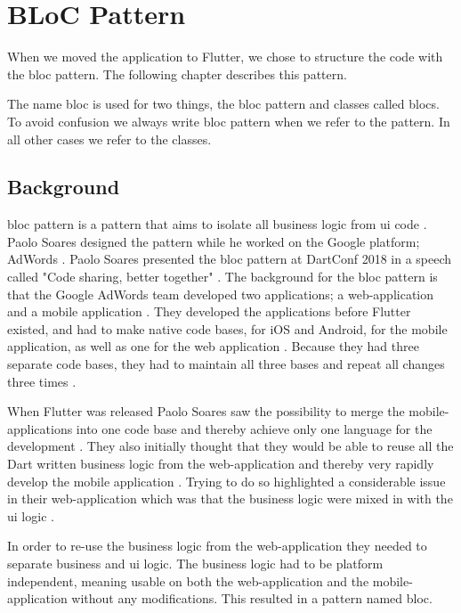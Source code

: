 \section{BLoC Pattern}
When we moved the application to Flutter, we chose to structure the code with the \gls{bloc} pattern. The following chapter describes this pattern.

The name \gls{bloc} is used for two things, the \gls{bloc} pattern and classes called \glspl{bloc}. To avoid confusion we always write \gls{bloc} pattern when we refer to the pattern. In all other cases we refer to the classes.

\subsection{Background}
\gls{bloc} pattern is a pattern that aims to isolate all business logic from \gls{ui} code \cite{blocPattern}. Paolo Soares designed the pattern while he worked on the Google platform; AdWords \cite[30 sec]{blocPattern}. Paolo Soares presented the \gls{bloc} pattern at DartConf 2018 in a speech called "Code sharing, better together" \cite{blocPattern}.
The background for the \gls{bloc} pattern is that the Google AdWords team  developed two applications; a web-application and a mobile application \cite[30 sec]{blocPattern}.
They developed the applications before Flutter existed, and had to make native code bases, for iOS and Android, for the mobile application, as well as one for the web application \cite[30 sec]{blocPattern}.
Because they had three separate code bases, they had to maintain all three bases and repeat all changes three times \cite[30 sec]{blocPattern}.

When Flutter was released Paolo Soares saw the possibility to merge the mobile-applications into one code base and thereby achieve only one language for the development \cite[1 min 15 sec]{blocPattern}. They also initially thought that they would be able to reuse all the Dart written business logic from the web-application and thereby very rapidly develop the mobile application \cite[1 min 48 sec]{blocPattern}. Trying to do so highlighted a considerable issue in their web-application which was that the business logic were mixed in with the \gls{ui} logic \cite[2 min 12 sec]{blocPattern}.

In order to re-use the business logic from the web-application they needed to separate business and \gls{ui} logic. The business logic had to be platform independent, meaning usable on both the web-application and the mobile-application without any modifications\cite[2 min 12 sec]{blocPattern}. This resulted in a pattern named \gls{bloc}.

